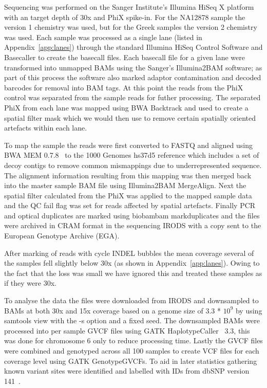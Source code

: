 \documentclass{article}
\begin{document}
  {Sequencing was performed on the Sanger Institute's Illumina HiSeq X platform with an target depth of 30x and PhiX spike-in. For the NA12878 sample the version 1 chemistry was used, but for the Greek samples the version 2 chemistry was used. Each sample was processed as a single lane (listed in Appendix~\ref{app:lanes}) through the standard Illumina HiSeq Control Software and Basecaller to create the basecall files. Each basecall file for a given lane were transformed into unmapped BAMs using the Sanger's Illumina2BAM software; as part of this process the software also marked adaptor contamination and decoded barcodes for removal into BAM tags. At this point the reads from the PhiX control was separated from the sample reads for futher processing. The separated PhiX from each lane was mapped using BWA Backtrack and used to create a spatial filter mask which we would then use to remove certain spatially oriented artefacts within each lane.}

  {To map the sample the reads were first converted to FASTQ and aligned using BWA MEM 0.7.8~\cite{bwamem} to the 1000 Genomes hs37d5 reference which includes a set of decoy contigs to remove common mismappings due to underrepresented sequence.  The alignment information resulting from this mapping was then merged back into the master sample BAM file using Illumina2BAM MergeAlign. Next the spatial filter calculated from the PhiX was applied to the mapped sample data and the QC fail flag was set for reads affected by spatial artefacts. Finally PCR and optical duplicates are marked using biobambam markduplicates and the files were archived in CRAM format in the sequencing IRODS with a copy sent to the European Genotype Archive (EGA).}

  {After marking of reads with cycle INDEL bubbles the mean coverage several of the samples fell slightly below 30x (as shown in Appendix~\ref{app:lanes}). Owing to the fact that the loss was small we have ignored this and treated these samples as if they were 30x.}

  {To analyse the data the files were downloaded from IRODS and downsampled to BAMs at both 30x and 15x coverage based on a genome size of 3.3 *  $10^{9}$ by using samtools view with the -s option and a fixed seed. The downsampled BAMs were processed into per sample GVCF files using GATK HaplotypeCaller~\cite{gatk} 3.3, this was done for chromosome 6 only to reduce processing time. Lastly the GVCF files were combined and genotyped across all 100 samples to create VCF files for each coverage level using GATK GenotypeGVCFs. To aid in later statistics gathering known variant sites were identified and labelled with IDs from dbSNP version 141~\cite{dbsnp}.}
\end{document}

